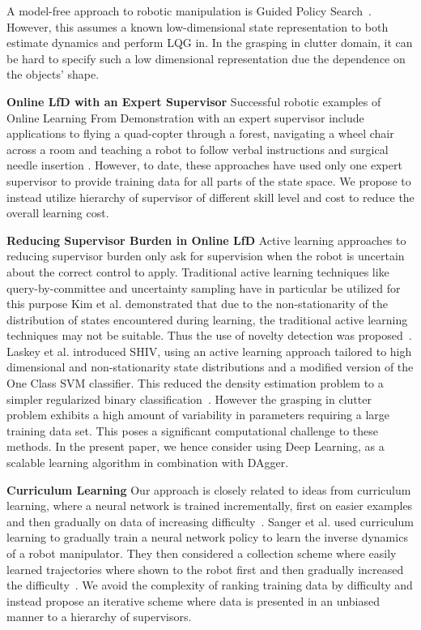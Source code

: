 \documentclass[10pt, conference]{ieeeconf}      %
\begin{document}
A model-free approach to robotic manipulation is Guided Policy Search~\cite{levine2015end}. However, this assumes a
known low-dimensional state representation to both estimate dynamics and perform LQG in. In the grasping in clutter
domain, it can be hard to specify such a low dimensional representation due the dependence on the objects' shape.

\noindent \textbf{Online LfD with an Expert Supervisor}
Successful robotic examples of Online Learning From Demonstration with an expert supervisor include applications to flying a quad-copter through a forest, navigating a wheel chair across a room and teaching a robot to follow verbal instructions and surgical needle insertion \cite{ross2013learning, kim2013maximum, duvallet2013imitation, laskeyshiv}. 
However, to date, these approaches have used only one expert supervisor to provide training data for all parts of the
state space. We propose to instead utilize hierarchy of supervisor of different skill level and cost to reduce the
overall learning cost. 

\noindent\textbf{Reducing Supervisor Burden in Online LfD} 
Active learning approaches to reducing supervisor burden only ask for supervision when the robot is uncertain about the
correct control to apply. Traditional active learning techniques like query-by-committee and uncertainty sampling have
in particular be utilized for this purpose \cite{chernova2009interactive,judah2011active,grollman2007dogged}
Kim et al. demonstrated that due to the non-stationarity of the distribution of states encountered during
learning, the traditional active learning techniques may not be suitable.
Thus the use of novelty detection was proposed~\cite{kim2013maximum}. Laskey et al. introduced SHIV, using an active
learning approach tailored to high dimensional and non-stationarity state distributions and a modified version of the
One Class SVM classifier. This reduced the density estimation problem to a 
simpler regularized binary classification~\cite{laskeyshiv}. However the grasping in clutter problem exhibits a high amount
of variability in parameters requiring a large training data set. This poses a significant computational challenge to these methods.
In the present paper, we hence consider using Deep Learning, as a scalable learning algorithm in combination
with DAgger.

\noindent\textbf{Curriculum Learning}
Our approach is closely related to ideas from curriculum learning, where a neural network is trained  
incrementally, first on easier examples and then gradually on data of increasing difficulty~\cite{bengio2009curriculum}.
Sanger et al. used curriculum learning to gradually train a neural network policy to learn the inverse
dynamics of a robot manipulator. They then considered a collection scheme where easily learned trajectories where shown
to the robot first and then gradually increased the difficulty~\cite{sanger1994neural}.
We avoid the complexity of ranking training data by difficulty and instead propose an iterative scheme where
data is presented in an unbiased manner to a hierarchy of supervisors.
\end{document}
